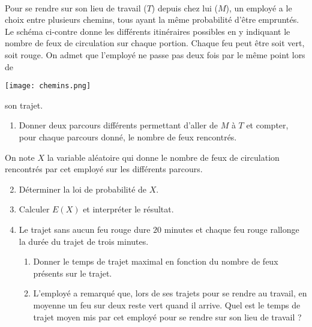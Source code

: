 \documentclass[11pt]{article}
\begin{document}
\begin{exo}~\\%
  \begin{minipage}{.5\textwidth}
    Pour se rendre sur son lieu de travail ($T$) depuis chez lui ($M$), un
    employé a le choix entre plusieurs chemins, tous ayant la même probabilité
    d'être empruntés. Le schéma ci-contre donne les différents itinéraires
    possibles en y indiquant le nombre de feux de circulation sur chaque
    portion. Chaque feu peut être soit vert, soit rouge. On admet que l'employé
    ne passe pas deux fois par le même point lors de
  \end{minipage}
  \begin{minipage}{.5\textwidth}
    \begin{center}
      \texttt{[image: chemins.png]}
    \end{center}
  \end{minipage}
  son trajet.
  \begin{enumerate}
    \item Donner deux parcours différents permettant d'aller de $M$ à $T$ et
      compter, pour chaque parcours donné, le nombre de feux rencontrés.
  \end{enumerate}
  On note $X$ la variable aléatoire qui donne le nombre de feux de circulation
  rencontrés par cet employé sur les différents parcours.
  \begin{enumerate}
      \setcounter{enumi}{1}
    \item Déterminer la loi de probabilité de $X$.
    \item Calculer $E\left( X \right)$ et interpréter le résultat.
    \item Le trajet sans aucun feu rouge dure $20$ minutes et chaque feu rouge
      rallonge la durée du trajet de trois minutes.
      \begin{enumerate}
        \item Donner le temps de trajet maximal en fonction du nombre de feux
          présents sur le trajet.
        \item L'employé a remarqué que, lors de ses trajets pour se rendre au
          travail, en moyenne un feu sur deux reste vert quand il arrive. Quel
          est le temps de trajet moyen mis par cet employé pour se rendre sur
          son lieu de travail ?
      \end{enumerate}
  \end{enumerate}
\end{exo}
\end{document}
